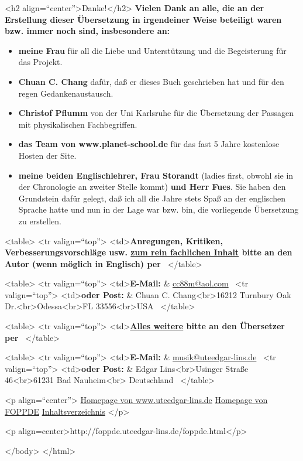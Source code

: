 


\hypertarget{Danke}{}

<h2 align=\enquote{center}>Danke!</h2>
\textbf{Vielen Dank an alle, die an der Erstellung dieser Übersetzung in irgendeiner Weise beteiligt waren bzw. immer noch sind, insbesondere an:}


\begin{itemize} 
 \item \textbf{meine Frau} für all die Liebe und Unterstützung und die Begeisterung für das Projekt.
 \item \textbf{Chuan C. Chang} dafür, daß er dieses Buch geschrieben hat und für den regen Gedankenaustausch.
 \item \textbf{Christof Pflumm} von der Uni Karlsruhe für die Übersetzung der Passagen mit physikalischen Fachbegriffen.
 \item \textbf{das Team von www.planet-school.de} für das fast 5 Jahre kostenlose Hosten der Site.
 \item \textbf{meine beiden Englischlehrer, Frau Storandt} (ladies first, obwohl sie in der Chronologie an zweiter Stelle kommt) \textbf{und Herr Fues}.
Sie haben den Grundstein dafür gelegt, daß ich all die Jahre stets Spaß an der englischen Sprache hatte und nun in der Lage war bzw. bin, die vorliegende Übersetzung zu erstellen.
 \end{itemize}






\hypertarget{kontakt}{}

<table>
 <tr valign=\enquote{top}>
  <td>\textbf{Anregungen, Kritiken, Verbesserungsvorschläge usw. \underline{zum rein fachlichen Inhalt} bitte an den Autor (wenn möglich in Englisch) per}
   \ 
</table>

<table>
 <tr valign=\enquote{top}>
  <td>\textbf{E-Mail:} & \hyperref[mailto:cc88m@aol.com?subject=foppde]{cc88m@aol.com} \ 
 <tr valign=\enquote{top}>
  <td>\textbf{oder Post:} & Chuan C. Chang<br>16212 Turnbury Oak Dr.<br>Odessa<br>FL 33556<br>USA \ 
</table>

\hypertarget{mailel}{}

<table>
 <tr valign=\enquote{top}>
  <td>\textbf{\underline{Alles weitere} bitte an den Übersetzer per} \ 
</table>

<table>
 <tr valign=\enquote{top}>
  <td>\textbf{E-Mail:} & \hyperref[mailto:musik@uteedgar-lins.de?subject=foppde]{musik@uteedgar-lins.de} \ 
 <tr valign=\enquote{top}>
  <td>\textbf{oder Post:} & Edgar Lins<br>Usinger Straße 46<br>61231 Bad Nauheim<br>
Deutschland \ 
</table>



<p align=\enquote{center}>
\hyperref[http://www.uteedgar-lins.de/index.html]{Homepage von www.uteedgar-lins.de} 
\hyperref[./index.html]{Homepage von FOPPDE} 
\hyperlink{Inhalt}{Inhaltsverzeichnis} 
</p>

<p align=center>http://foppde.uteedgar-lins.de/foppde.html</p>

</body>
</html>
